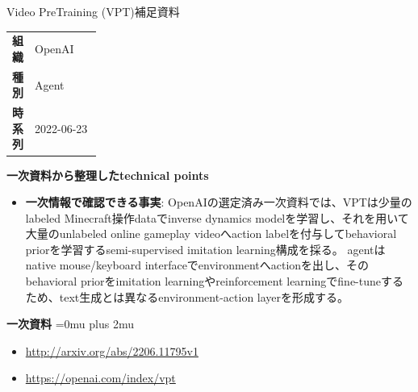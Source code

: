 \begin{technicalnote}{Video PreTraining (VPT)}{補足資料}
\begingroup
\begin{tabularx}{\linewidth}{@{}>{\bfseries}p{0.22\linewidth}X@{}}
組織 & OpenAI \\
種別 & Agent \\
時系列 & 2022-06-23 \\
\end{tabularx}
\smallskip
{\bfseries 一次資料から整理したtechnical points}
\begin{itemize}[leftmargin=1.5em,itemsep=0.35em]
\item \textbf{一次情報で確認できる事実}: OpenAIの選定済み一次資料では、VPTは少量のlabeled Minecraft操作dataでinverse dynamics modelを学習し、それを用いて大量のunlabeled online gameplay videoへaction labelを付与してbehavioral priorを学習するsemi-supervised imitation learning構成を採る。 agentはnative mouse/keyboard interfaceでenvironmentへactionを出し、そのbehavioral priorをimitation learningやreinforcement learningでfine-tuneするため、text生成とは異なるenvironment-action layerを形成する。
\end{itemize}
\begin{minipage}{\linewidth}
\begin{samepage}
{\bfseries 一次資料}
\begingroup\sloppy
\Urlmuskip=0mu plus 2mu\relax
\begin{itemize}[leftmargin=1.5em,itemsep=0.25em]
\item {\scriptsize\url{http://arxiv.org/abs/2206.11795v1}}
\item {\scriptsize\url{https://openai.com/index/vpt}}
\end{itemize}
\endgroup
\end{samepage}
\end{minipage}
\endgroup
\end{technicalnote}
\medskip

